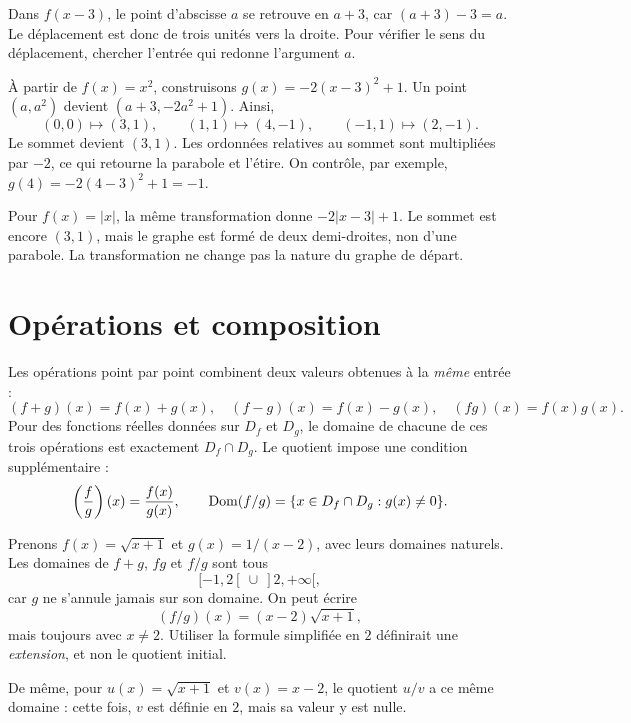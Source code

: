 \begin{warningbox}
Dans \(f(x-3)\), le point d'abscisse \(a\) se retrouve en \(a+3\), car \((a+3)-3=a\). Le déplacement est donc de trois unités vers la droite. Pour vérifier le sens du déplacement, chercher l'entrée qui redonne l'argument $a$.
\end{warningbox}

\begin{examplebox}[title={Suivre les points d'une parabole}]
À partir de \(f(x)=x^2\), construisons \(g(x)=-2(x-3)^2+1\). Un point \((a,a^2)\) devient \((a+3,-2a^2+1)\). Ainsi,
\[
(0,0)\mapsto(3,1),\qquad (1,1)\mapsto(4,-1),\qquad (-1,1)\mapsto(2,-1).
\]
Le sommet devient \((3,1)\). Les ordonnées relatives au sommet sont multipliées par \(-2\), ce qui retourne la parabole et l'étire. On contrôle, par exemple, \(g(4)=-2(4-3)^2+1=-1\).
\end{examplebox}

Pour \(f(x)=|x|\), la même transformation donne \(-2|x-3|+1\). Le sommet est encore \((3,1)\), mais le graphe est formé de deux demi-droites, non d'une parabole. La transformation ne change pas la nature du graphe de départ.

\section{Opérations et composition}
\label{manual:section:03.04}

Les opérations point par point combinent deux valeurs obtenues à la \emph{même} entrée :
\[
(f+g)(x)=f(x)+g(x),\quad (f-g)(x)=f(x)-g(x),\quad (fg)(x)=f(x)g(x).
\]
Pour des fonctions réelles données sur \(D_f\) et \(D_g\), le domaine de chacune de ces trois opérations est exactement \(D_f\cap D_g\). Le quotient impose une condition supplémentaire :
\[
\left(\frac fg\right)(x)=\frac{f(x)}{g(x)},\qquad
\operatorname{Dom}(f/g)=\{x\in D_f\cap D_g:g(x)\ne0\}.
\]

\begin{examplebox}[title={Simplifier ne rétablit pas une entrée interdite}]
Prenons \(f(x)=\sqrt{x+1}\) et \(g(x)=1/(x-2)\), avec leurs domaines naturels. Les domaines de \(f+g\), \(fg\) et \(f/g\) sont tous
\[
[-1,2[\ \cup\ ]2,+\infty[,
\]
car \(g\) ne s'annule jamais sur son domaine. On peut écrire
\[
(f/g)(x)=(x-2)\sqrt{x+1},
\]
mais toujours avec \(x\ne2\). Utiliser la formule simplifiée en \(2\) définirait une \emph{extension}, et non le quotient initial.
\end{examplebox}

De même, pour \(u(x)=\sqrt{x+1}\) et \(v(x)=x-2\), le quotient \(u/v\) a ce même domaine : cette fois, \(v\) est définie en \(2\), mais sa valeur y est nulle.

